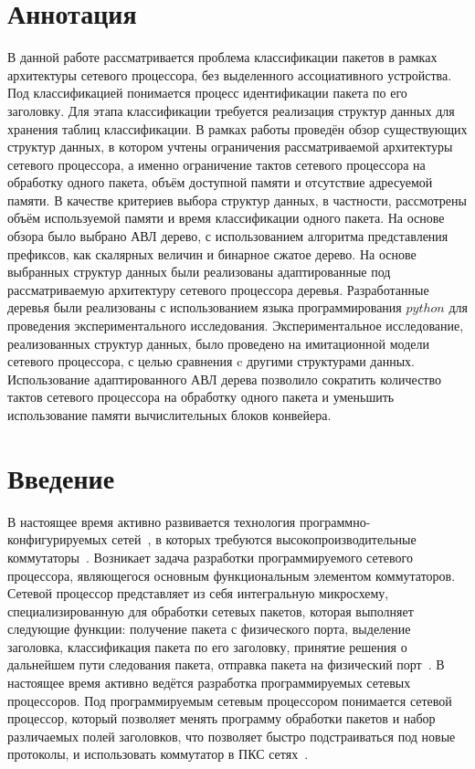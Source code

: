 \documentclass[a4paper, 12pt, titlepage, finall]{extreport}
\begin{document}
    \chapter*{Аннотация}
        В данной работе рассматривается проблема классификации пакетов в рамках архитектуры сетевого процессора, без выделенного ассоциативного устройства.
        Под классификацией понимается процесс идентификации пакета по его заголовку.
        Для этапа классификации требуется реализация структур данных для хранения таблиц классификации.
        В рамках работы проведён обзор существующих структур данных, в котором учтены ограничения рассматриваемой архитектуры сетевого процессора, а именно
        ограничение тактов сетевого процессора на обработку одного пакета, объём доступной памяти и отсутствие адресуемой памяти.
        В качестве критериев выбора структур данных, в частности, рассмотрены объём используемой памяти и время классификации одного пакета.
        На основе обзора было выбрано АВЛ дерево, с использованием алгоритма представления префиксов, как скалярных величин и бинарное сжатое дерево. 
        На основе выбранных структур данных были реализованы адаптированные под рассматриваемую архитектуру сетевого процессора деревья. 
        Разработанные деревья были реализованы с использованием языка программирования $python$ для проведения экспериментального исследования.
        Экспериментальное исследование, реализованных структур данных, было проведено на имитационной модели сетевого процессора,
        с целью сравнения c другими структурами данных. Использование адаптированного АВЛ дерева позволило 
        сократить количество тактов сетевого процессора на обработку одного пакета и уменьшить использование памяти вычислительных блоков конвейера.
        
    \newpage
    \tableofcontents
    \newpage

    \chapter*{Введение}
        В настоящее время активно развивается технология программно-конфигурируемых сетей~\cite{smel2012open}, в которых требуются высокопроизводительные 
        коммутаторы~\cite{bifulco2018survey}. Возникает задача разработки программируемого сетевого процессора, являющегося основным функциональным элементом коммутаторов. Сетевой процессор 
        представляет из себя интегральную микросхему, специализированную для обработки сетевых пакетов, которая выполняет следующие функции:
        получение пакета с физического порта, выделение заголовка,
        классификация пакета по его заголовку, принятие решения о дальнейшем пути следования пакета, отправка пакета на физический порт~\cite{chao2007high:1}.
        В настоящее время активно ведётся разработка программируемых сетевых процессоров. Под программируемым сетевым процессором
        понимается сетевой процессор, который позволяет менять программу обработки пакетов и набор различаемых полей заголовков, что позволяет быстро подстраиваться под новые протоколы, 
        и использовать коммутатор в ПКС сетях~\cite{bezzubtsev2019ob-odnom183708319}.
        
\end{document}
